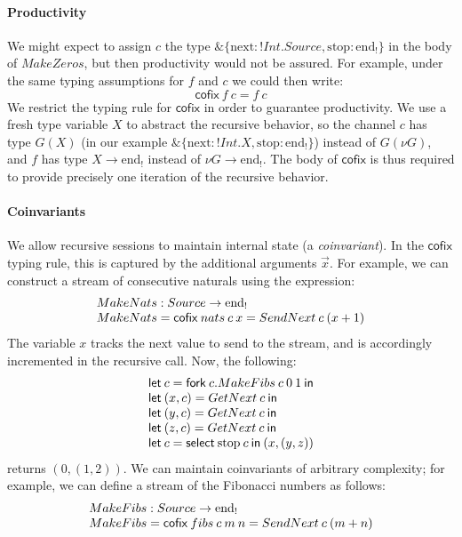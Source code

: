 \documentclass[orivec,envcountsame]{llncs}
\makeatletter
\newcommand{\with}{\mathbin\binampersand}
\newcommand{\uto}{\ensuremath{\rightarrow}}
\newcommand{\outterm}{\mathrm{end}_!}
\newcommand{\mkwd}[1]{\mathsf{#1}}
\newcommand{\clabel}[1]{\mathrm{#1}}
\newcommand{\gvselect}[2]{\mkwd{select}\:#1\:#2}
\newcommand{\gvfork}[2]{\mkwd{fork}\:#1.#2}
\newcommand{\lrkwd}{\mkwd{cofix}}
\newcommand{\gvfix}[3]{\lrkwd\:#1\:#2 = #3}
\newcommand{\key}{\mkwd}
\newcommand{\cofix}{\lrkwd}
\newcommand{\ba}{\begin{array}}
\newcommand{\ea}{\end{array}}
\newcommand{\bl}{\ba[t]{@{}l@{}}}
\newcommand{\el}{\ea}
\makeatother
\begin{document}
\paragraph{Productivity}
We might expect to assign $c$ the type $\with \{\clabel{next}: !Int.Source, \clabel{stop}: \outterm
\}$ in the body of $MakeZeros$, but then productivity would not be assured. For example, under the
same typing assumptions for $f$ and $c$ we could then write:
\[
\cofix\:f\:c = f\:c
\]
%
We restrict the typing rule for $\cofix$ in order to guarantee productivity. We use a fresh type
variable $X$ to abstract the recursive behavior, so the channel $c$ has type $G(X)$ (in our example
$\with \{\clabel{next}: !Int.X, \clabel{stop}: \outterm \}$) instead of $G(\nu G)$, and $f$ has type
$X \uto \outterm$ instead of $\nu G \uto \outterm$. The body of $\cofix$ is thus required to provide
precisely one iteration of the recursive behavior.

\paragraph{Coinvariants}

We allow recursive sessions to maintain internal state (a \emph{coinvariant}). In the $\cofix$
typing rule, this is captured by the additional arguments $\vec{x}$. For example, we can construct a
stream of consecutive naturals using the expression:
\[
\bl
  MakeNats : Source \uto \outterm \\
  MakeNats = \gvfix{nats}{c\:x}{SendNext\:c\:(x + 1)} \\
\el
\]
The variable $x$ tracks the next value to send to the stream, and is accordingly incremented in the
recursive call. Now, the following:
\[
\bl
\key{let}\:c = \gvfork{c}{MakeFibs\:c\:0\:1}\:\key{in} \\
\key{let}\:(x, c) = GetNext\:c\:\key{in} \\
\key{let}\:(y, c) = GetNext\:c\:\key{in} \\
\key{let}\:(z, c) = GetNext\:c\:\key{in} \\
\key{let}\:c = \gvselect{\clabel{stop}}{c}\:\key{in}\:(x,(y,z)) \\
\el
\]
returns $(0, (1, 2))$.
%
We can maintain coinvariants of arbitrary complexity; for example, we can define a
stream of the Fibonacci numbers as follows:
\[
\bl
  MakeFibs : Source \uto \outterm \\
  MakeFibs = \gvfix{fibs}{c\:m\:n}{SendNext\:c\:(m + n)} \\
\el
\]
\end{document}

